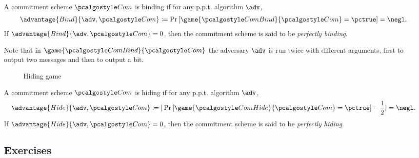 \begin{definition}[Binding]
  A commitment scheme $\algo{Com}$ is binding if for any p.p.t. algorithm $\adv$,
 \[
  \advantage{Bind}{\adv, \algo{Com}} \defeq \pr{\game{\algo{ComBind}}{\algo{Com}} = \pctrue} = \negl.
 \]
 If $\advantage{Bind}{\adv, \algo{Com}} = 0$, then the commitment scheme is said to be \emph{perfectly binding}.
\end{definition}

Note that in $\game{\algo{ComBind}}{\algo{Com}}$ the adversary $\adv$ is run twice with different arguments, first to output two messages and then to output a bit.

\begin{figure}[tbhp]
  \begin{center}
    \begin{tcolorbox}[width=8cm]
      \begin{pchstack}[center]
      \end{pchstack}
    \end{tcolorbox}
  \end{center}
  \caption{Hiding game \label{fig:break-com-hid}}
\end{figure}

\begin{definition}[Hiding]
  A commitment scheme $\algo{Com}$ is hiding if for any p.p.t. algorithm $\adv$,
 \[
  \advantage{Hide}{\adv, \algo{Com}} \defeq |\pr{\game{\algo{ComHide}}{\algo{Com}} = \pctrue} - \frac{1}{2}| = \negl.
 \]
 If $\advantage{Hide}{\adv, \algo{Com}} = 0$, then the commitment scheme is said to be \emph{perfectly hiding}.
\end{definition}

\subsection{Exercises}

